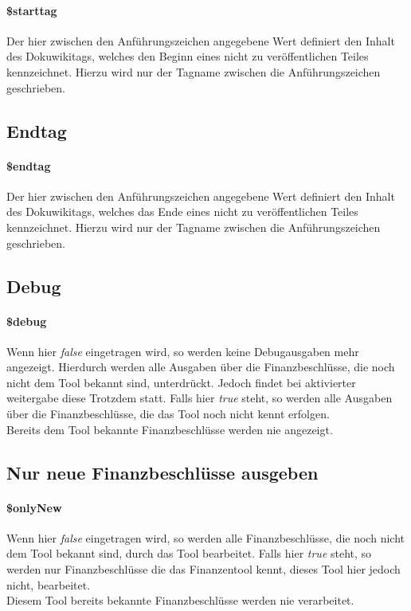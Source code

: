 \documentclass[12pt,parskip=full, pagea4]{scrartcl}
\begin{document}
	\paragraph{\$starttag} Der hier zwischen den Anführungszeichen angegebene Wert definiert den Inhalt des Dokuwikitags, welches den Beginn eines nicht zu veröffentlichen Teiles kennzeichnet. Hierzu wird nur der Tagname zwischen die Anführungszeichen geschrieben.
	
	\subsection{Endtag}
	\paragraph{\$endtag} Der hier zwischen den Anführungszeichen angegebene Wert definiert den Inhalt des Dokuwikitags, welches das Ende eines nicht zu veröffentlichen Teiles kennzeichnet. Hierzu wird nur der Tagname zwischen die Anführungszeichen geschrieben.
		
	\subsection{Debug}
	\paragraph{\$debug} Wenn hier \textit{false} eingetragen wird, so werden keine Debugausgaben mehr angezeigt. Hierdurch werden alle Ausgaben über die Finanzbeschlüsse, die noch nicht dem Tool bekannt sind, unterdrückt. Jedoch findet bei aktivierter weitergabe diese Trotzdem statt. Falls hier \textit{true} steht, so werden alle Ausgaben über die Finanzbeschlüsse, die das Tool noch nicht kennt erfolgen. \\
	Bereits dem Tool bekannte Finanzbeschlüsse werden nie angezeigt.
	
	\subsection{Nur neue Finanzbeschlüsse ausgeben}
	\paragraph{\$onlyNew} Wenn hier \textit{false} eingetragen wird, so werden alle Finanzbeschlüsse, die noch nicht dem Tool bekannt sind, durch das Tool bearbeitet. Falls hier \textit{true} steht, so werden nur Finanzbeschlüsse die das Finanzentool kennt, dieses Tool hier jedoch nicht, bearbeitet. \\
	Diesem Tool bereits bekannte Finanzbeschlüsse werden nie verarbeitet.
	
\end{document}
